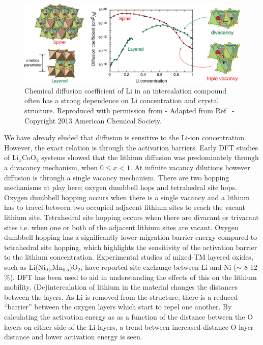 \documentclass[../main.tex]{subfiles}
\begin{document}
\begin{figure}
    \centering
    \includegraphics[scale=0.26]{figures/LixTiS2_diffusion.jpeg}
    \caption{ Chemical diffusion coefficient of Li in an intercalation compound often has a strong dependence on Li concentration and crystal structure. Reproduced with permission from  - Adapted from Ref~ - Copyright 2013 American Chemical Society.}
    \label{fig:LixTiS2_diffusion}
\end{figure}

We have already eluded that diffusion is sensitive to the Li-ion concentration. However, the exact relation is through the activation barriers. Early DFT studies \cite{van2000lithium,van2001lithium} of Li$_x$CoO$_2$ systems showed that the lithium diffusion was predominately through a divacancy mechanism, when $0\leq x < 1$. At infinite vacancy dilutions however diffusion is through a single vacancy mechanism. \cite{islam2014lithium} There are two hopping mechanisms at play here; oxygen dumbbell hops and tetrahedral site hops. Oxygen dumbbell hopping occurs when there is a single vacancy and a lithium has to travel between two occupied adjacent lithium sites to reach the vacant lithium site. Tetrahedral site hopping occurs when there are divacant or trivacant sites i.e.  when one or both of the adjacent lithium sites are vacant. \cite{van2001lithium} Oxygen dumbbell hopping has a significantly lower migration barrier energy compared to tetrahedral site hopping, which highlights the sensitivity of the activation barrier to the lithium concentration. Experimental studies of mixed-TM layered oxides, such as Li(Ni$_{0.5}$Mn$_{0.5}$)O$_2$, have reported site exchange between Li and Ni ($\sim$ 8-12 \%). \cite{choi2005structural} DFT has been used to aid in understanding the effects of this on the lithium mobility. \cite{kang2006electrodes,laubach2009structure} (De)intercalation of lithium in the material changes the distances between the layers. As Li is removed from the structure, there is a reduced ``barrier'' between the oxygen layers which start to repel one another. By calculating the activation energy as as a function of the distance between the O layers on either side of the Li layers, a trend between increased distance O layer distance and lower activation energy is seen. \cite{kang2006electrodes,laubach2009structure}
\end{document}
